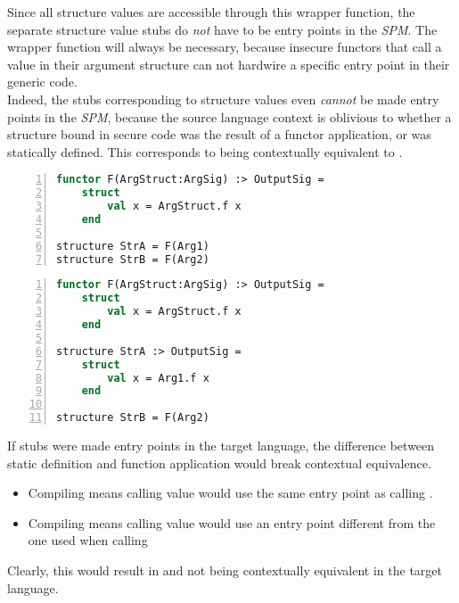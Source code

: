 Since all structure values are accessible through this wrapper function, the separate structure value stubs do \emph{not} have to be entry points in the \emph{SPM}. The wrapper function will always be necessary, because insecure functors that call a value in their argument structure can not hardwire a specific entry point in their generic code.
\\[1em]
\label{sec:StaticDefinitionFunctorApplication}
Indeed, the stubs corresponding to structure values even \emph{cannot} be made entry points in the \emph{SPM}, because the source language context is oblivious to whether a structure bound in secure code was the result of a functor application, or was statically defined. This corresponds to  being contextually equivalent to .

\begin{lstlisting}[frame=single,numbers=left, language=ML, caption={[Functor Application or Static Definition: 1]Binding StrA and StrB using functor application.},
label=lst:FunctorApplicationOrStaticDefinition1, morekeywords={where}]
functor F(ArgStruct:ArgSig) :> OutputSig =
    struct
        val x = ArgStruct.f x
    end
    
structure StrA = F(Arg1)
structure StrB = F(Arg2)
\end{lstlisting}

\begin{lstlisting}[frame=single,numbers=left, language=ML, caption={[Functor Application or Static Definition: 2]Binding StrA and StrB using both static definition and functor application.},
label=lst:FunctorApplicationOrStaticDefinition2, morekeywords={where}]
functor F(ArgStruct:ArgSig) :> OutputSig =
    struct
        val x = ArgStruct.f x
    end
    
structure StrA :> OutputSig =
    struct
        val x = Arg1.f x
    end

structure StrB = F(Arg2)
\end{lstlisting}


If stubs were made entry points in the target language, the difference between static definition and function application would break contextual equivalence.
\begin{itemize}
\item Compiling  means calling value  would use the same entry point as calling .
\item Compiling  means calling value  would use an entry point different from the one used when calling 
\end{itemize}
Clearly, this would result in  and  not being contextually equivalent in the target language.

